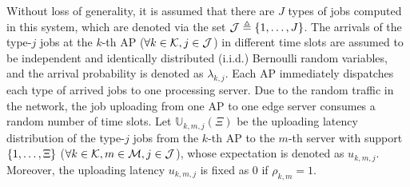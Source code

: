 %
Without loss of generality, it is assumed that there are $J$ types of jobs computed in this system, which are denoted via the set $\mathcal{J} \triangleq \{1,\dots,J\}$.
The arrivals of the type-$j$ jobs at the $k$-th AP ($\forall k\in\mathcal{K},j\in\mathcal{J}$) in different time slots are assumed to be independent and identically distributed (i.i.d.) Bernoulli random variables, and the arrival probability is denoted as $\lambda_{k,j}$.
Each AP immediately dispatches each type of arrived jobs to one processing server.
Due to the random traffic in the network, the job uploading from one AP to one edge server consumes a random number of time slots.
Let $\mathbb{U}_{k,m,j}(\Xi)$ be the uploading latency distribution of the type-$j$ jobs from the $k$-th AP to the $m$-th server with support $\{1, \dots, \Xi\}$ ($\forall k\in\mathcal{K}, m\in\mathcal{M}, j\in\mathcal{J}$), whose expectation is denoted as $u_{k,m,j}$.
Moreover, the uploading latency $u_{k,m,j}$ is fixed as $0$ if $\rho_{k,m}=1$.

